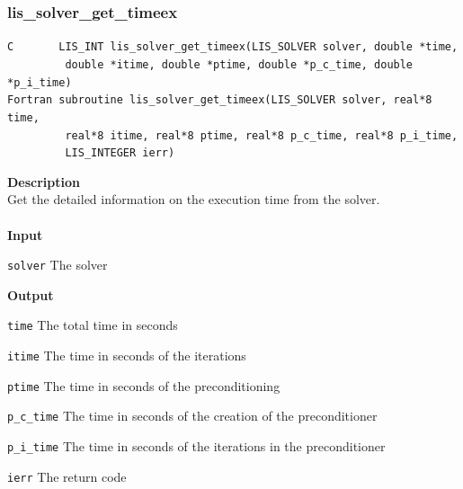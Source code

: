 \documentclass[a4paper]{article}
\newcommand{\namelistlabel}[1]{\mbox{#1}\hfill}
\newenvironment{namelist}[1]{%
\begin{list}{}
  {\let\makelabel\namelistlabel
  \settowidth{\labelwidth}{#1}
  \setlength{\leftmargin}{1.1\labelwidth}}
  }{%
\end{list}}
\begin{document}
\newpage
\subsubsection{lis\_solver\_get\_timeex}
\begin{screen}
\verb|C       LIS_INT lis_solver_get_timeex(LIS_SOLVER solver, double *time,|\\
\verb|         double *itime, double *ptime, double *p_c_time, double *p_i_time)|\\
\verb|Fortran subroutine lis_solver_get_timeex(LIS_SOLVER solver, real*8 time,|\\
\verb|         real*8 itime, real*8 ptime, real*8 p_c_time, real*8 p_i_time,|\\
\verb|         LIS_INTEGER ierr)|
\end{screen}
{\bf Description}\\
\indent
Get the detailed information on the execution time from the solver.
\\ \\
\noindent
{\bf Input}
\begin{namelist}{XXXXXXXXXXXXXXXXXXXX}
\item[\tt solver] The solver
\end{namelist}
{\bf Output}
\begin{namelist}{XXXXXXXXXXXXXXXXXXXX}
\item[\tt time] The total time in seconds
\item[\tt itime] The time in seconds of the iterations
\item[\tt ptime] The time in seconds of the preconditioning
\item[\tt p\_c\_time] The time in seconds of the creation of the preconditioner
\item[\tt p\_i\_time] The time in seconds of the iterations in the preconditioner
\item[\tt ierr] The return code
\end{namelist}
\end{document}
